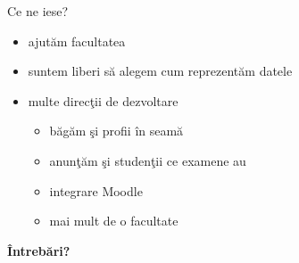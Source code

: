 \documentclass{beamer}
\begin{document}
\begin{frame}{Ce ne iese?}
\begin{itemize}
  \pause
  \item ajutăm facultatea
  \pause
  \item suntem liberi să alegem cum reprezentăm datele
  \pause
  \item multe direcţii de dezvoltare
  \begin{itemize}
    \pause
    \item băgăm şi profii în seamă
    \pause
    \item anunţăm şi studenţii ce examene au
    \pause
    \item integrare Moodle
    \pause
    \item mai mult de o facultate
  \end{itemize}
\end{itemize}
\end{frame}

\begin{frame}
  \begin{center}
    { \Huge \bf Întrebări? }
  \end{center}
\end{frame}
\end{document}
